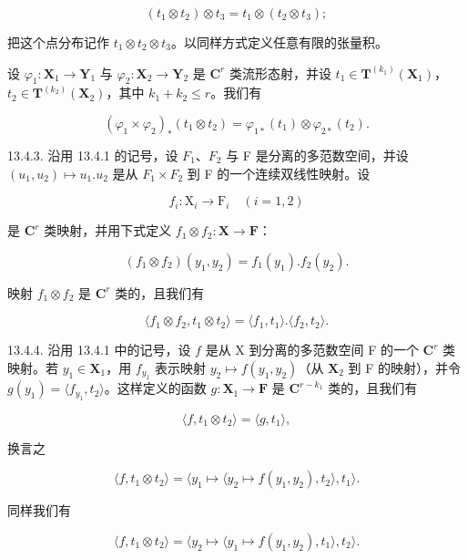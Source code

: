 \[
\left(t _ {1} \otimes t _ {2}\right) \otimes t _ {3} = t _ {1} \otimes \left(t _ {2} \otimes t _ {3}\right);
\]

把这个点分布记作 \(t_{1} \otimes t_{2} \otimes t_{3}\)。以同样方式定义任意有限的张量积。

设 \(\varphi_{1}\colon\mathbf{X}_{1}\to\mathbf{Y}_{1}\) 与 \(\varphi_{2}\colon\mathbf{X}_{2}\to\mathbf{Y}_{2}\) 是 \(\mathbf{C}^{r}\) 类流形态射，并设 \(t_{1}\in\mathbf{T}^{(k_{1})}(\mathbf{X}_{1})\)，\(t_{2}\in\mathbf{T}^{(k_{2})}(\mathbf{X}_{2})\)，其中 \(k_{1}+k_{2}\leqslant r\)。我们有

\[
(\varphi_ {1} \times \varphi_ {2}) _ {*} (t _ {1} \otimes t _ {2}) = \varphi_ {1 *} (t _ {1}) \otimes \varphi_ {2 *} (t _ {2}).
\]

13.4.3. 沿用 13.4.1 的记号，设 \(F_{1}\)、\(F_{2}\) 与 F 是分离的多范数空间，并设 \((u_{1}, u_{2}) \mapsto u_{1}.u_{2}\) 是从 \(F_{1} \times F_{2}\) 到 F 的一个连续双线性映射。设

\[
f _ {i} \colon \mathrm{X} _ {i} \rightarrow \mathrm{F} _ {i} \quad (i = 1, 2)
\]

是 \(\mathbf{C}^r\) 类映射，并用下式定义 \(f_1 \otimes f_2: \mathbf{X} \to \mathbf{F}\)：

\[
(f _ {1} \otimes f _ {2}) (y _ {1}, y _ {2}) = f _ {1} (y _ {1}). f _ {2} (y _ {2}).
\]

映射 \(f_{1} \otimes f_{2}\) 是 \(\mathbf{C}^{r}\) 类的，且我们有

\[
\langle f _ {1} \otimes f _ {2}, t _ {1} \otimes t _ {2} \rangle = \langle f _ {1}, t _ {1} \rangle . \langle f _ {2}, t _ {2} \rangle .
\]

13.4.4. 沿用 13.4.1 中的记号，设 \(f\) 是从 X 到分离的多范数空间 F 的一个 \(\mathbf{C}^{r}\) 类映射。若 \(y_{1} \in \mathbf{X}_{1}\)，用 \(f_{y_{1}}\) 表示映射 \(y_{2} \mapsto f(y_{1}, y_{2})\)（从 \(\mathbf{X}_{2}\) 到 F 的映射），并令 \(g(y_{1}) = \langle f_{y_{1}}, t_{2} \rangle\)。这样定义的函数 \(g: \mathbf{X}_{1} \to \mathbf{F}\) 是 \(\mathbf{C}^{r - k_{1}}\) 类的，且我们有

\[
\langle f, t _ {1} \otimes t _ {2} \rangle = \langle g, t _ {1} \rangle ,
\]

换言之

\[
\langle f, t _ {1} \otimes t _ {2} \rangle = \langle y _ {1} \mapsto \langle y _ {2} \mapsto f (y _ {1}, y _ {2}), t _ {2} \rangle , t _ {1} \rangle .
\]

同样我们有

\[
\langle f, t _ {1} \otimes t _ {2} \rangle = \langle y _ {2} \mapsto \langle y _ {1} \mapsto f (y _ {1}, y _ {2}), t _ {1} \rangle , t _ {2} \rangle .
\]

